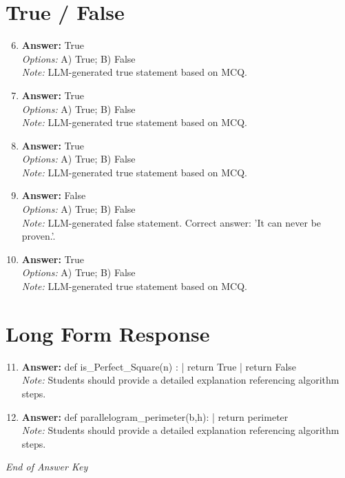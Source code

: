 \documentclass[12pt]{article}
\begin{document}
\section*{True / False}
\begin{enumerate}[label=\arabic*.]
\setcounter{enumi}{5}
\item \textbf{Answer:} True
\\ \textit{Options:} A) True; B) False
\\ \textit{Note:} LLM-generated true statement based on MCQ.
\item \textbf{Answer:} True
\\ \textit{Options:} A) True; B) False
\\ \textit{Note:} LLM-generated true statement based on MCQ.
\item \textbf{Answer:} True
\\ \textit{Options:} A) True; B) False
\\ \textit{Note:} LLM-generated true statement based on MCQ.
\item \textbf{Answer:} False
\\ \textit{Options:} A) True; B) False
\\ \textit{Note:} LLM-generated false statement. Correct answer: 'It can never be proven.'.
\item \textbf{Answer:} True
\\ \textit{Options:} A) True; B) False
\\ \textit{Note:} LLM-generated true statement based on MCQ.
\end{enumerate}

\section*{Long Form Response}
\begin{enumerate}[label=\arabic*.]
\setcounter{enumi}{10}
\item \textbf{Answer:} def is\_Perfect\_Square(n) : | return True | return False
\\ \textit{Note:} Students should provide a detailed explanation referencing algorithm steps.
\item \textbf{Answer:} def parallelogram\_perimeter(b,h): | return perimeter
\\ \textit{Note:} Students should provide a detailed explanation referencing algorithm steps.
\end{enumerate}

\vfill
\noindent\textit{End of Answer Key}
\end{document}
